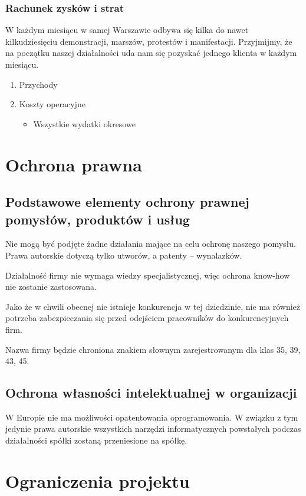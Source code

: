 \documentclass{article}
\begin{document}
\subsubsection{Rachunek zysków i strat}
W każdym miesiącu w samej Warszawie odbywa się kilka do nawet kilkudziesięciu demonstracji, marszów, protestów i manifestacji. Przyjmijmy, że na początku naszej działalności uda nam się pozyskać jednego klienta w każdym miesiącu.

\begin{enumerate}
\item Przychody

\item Koszty operacyjne
\begin{itemize}
\item Wszystkie wydatki okresowe 
\end{itemize}

\end{enumerate}

\section{Ochrona prawna}
\subsection{Podstawowe elementy ochrony prawnej pomysłów, produktów i usług}
Nie mogą być podjęte żadne działania mające na celu ochronę naszego pomysłu. Prawa autorskie dotyczą tylko utworów, a patenty -- wynalazków. 

Działalność firmy nie wymaga wiedzy specjalistycznej, więc ochrona know-how nie zostanie zastosowana.

Jako że w chwili obecnej nie istnieje konkurencja w tej dziedzinie, nie ma również potrzeba zabezpieczania się przed odejściem pracowników do konkurencyjnych firm.

Nazwa firmy będzie chroniona znakiem słownym zarejestrowanym dla klas 35, 39, 43, 45.
\subsection{Ochrona własności intelektualnej w organizacji}
W Europie nie ma możliwości opatentowania oprogramowania. W związku z tym jedynie prawa autorskie wszystkich narzędzi informatycznych powstałych podczas działalności spółki zostaną przeniesione na spółkę.

\section{Ograniczenia projektu}





\end{document}
